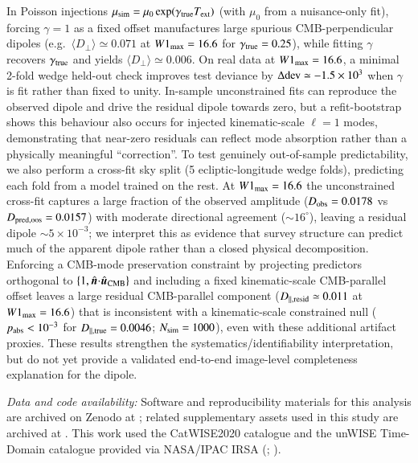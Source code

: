 \documentclass[fleqn,usenatbib]{mnras}
\begin{document}
In Poisson injections $\mu_{\rm sim}=\mu_0\exp(\gamma_{\rm true}T_{\rm ext})$ (with $\mu_0$ from a nuisance-only fit), forcing $\gamma=1$ as a fixed offset manufactures large spurious CMB-perpendicular dipoles (e.g.\ $\langle D_\perp\rangle\simeq0.071$ at $W1_{\rm max}=16.6$ for $\gamma_{\rm true}=0.25$), while fitting $\gamma$ recovers $\gamma_{\rm true}$ and yields $\langle D_\perp\rangle\simeq0.006$.
On real data at $W1_{\rm max}=16.6$, a minimal 2-fold wedge held-out check improves test deviance by $\Delta{\rm dev}\simeq-1.5\times10^3$ when $\gamma$ is fit rather than fixed to unity.
In-sample unconstrained fits can reproduce the observed dipole and drive the residual dipole towards zero, but a refit-bootstrap shows this behaviour also occurs for injected kinematic-scale $\ell=1$ modes, demonstrating that near-zero residuals can reflect mode absorption rather than a physically meaningful ``correction''.
To test genuinely out-of-sample predictability, we also perform a cross-fit sky split (5 ecliptic-longitude wedge folds), predicting each fold from a model trained on the rest.
At $W1_{\rm max}=16.6$ the unconstrained cross-fit captures a large fraction of the observed amplitude ($D_{\rm obs}=0.0178$ vs $D_{\rm pred,oos}=0.0157$) with moderate directional agreement ($\sim16^\circ$), leaving a residual dipole $\sim5\times10^{-3}$; we interpret this as evidence that survey structure can predict much of the apparent dipole rather than a closed physical decomposition.
Enforcing a CMB-mode preservation constraint by projecting predictors orthogonal to $\{1,\hat{\bm n}\!\cdot\!\hat{\bm u}_{\rm CMB}\}$ and including a fixed kinematic-scale CMB-parallel offset leaves a large residual CMB-parallel component ($D_{\parallel,{\rm resid}}\simeq 0.011$ at $W1_{\rm max}=16.6$) that is inconsistent with a kinematic-scale constrained null ($p_{\rm abs}<10^{-3}$ for $D_{\parallel,{\rm true}}=0.0046$; $N_{\rm sim}=1000$), even with these additional artifact proxies.
These results strengthen the systematics/identifiability interpretation, but do not yet provide a validated end-to-end image-level completeness explanation for the dipole.

\clearpage

\noindent\textit{Data and code availability:} Software and reproducibility materials for this analysis are archived on Zenodo at ; related supplementary assets used in this study are archived at .
This work used the CatWISE2020 catalogue and the unWISE Time-Domain catalogue provided via NASA/IPAC IRSA (; ).
\end{document}
